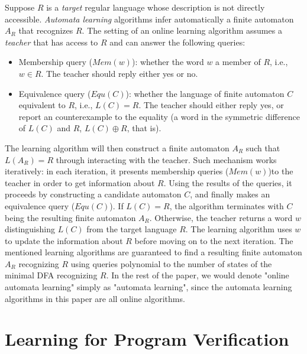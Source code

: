 Suppose $R$ is a \emph{target} regular language whose description is not directly accessible. \emph{Automata learning} algorithms \cite{Angluin87, BolligHKL09, RivestS93, KearnsV94} infer automatically a finite automaton $A_R$ that recognizes $R$. The setting of an online learning algorithm assumes a \emph{teacher} that has access to $R$ and can answer the following queries:
\begin{itemize}
	\item Membership query ($Mem(w)$): whether the word $w$ a member of $R$, i.e., $w \in R$. The teacher should reply either yes or no. 
	\item Equivalence query ($Equ(C)$): whether the language of finite automaton $C$ equivalent to $R$, i.e., $L(C) = R$. The teacher should either reply yes, or report an counterexample to the equality (a word in the symmetric difference of $L(C)$ and $R$, $L(C) \oplus R$, that is).	
\end{itemize}
The learning algorithm will then construct a finite automaton $A_R$ such that $L(A_R) = R$ through interacting with the teacher. Such mechanism works iteratively: in each iteration, it presents membership queries ($Mem(w)$)to the teacher in order to get information about $R$. Using the results of the queries, it proceeds by constructing a candidate automaton $C$, and finally makes an equivalence query ($Equ(C)$). If $L(C) = R$, the algorithm terminates with $C$ being the resulting finite automaton $A_R$. Otherwise, the teacher returns a word $w$ distinguishing $L(C)$ from the target language $R$. The learning algorithm uses $w$ to update the information about $R$ before moving on to the next iteration. The mentioned learning algorithms are guaranteed to find a resulting finite automaton $A_R$ recognizing $R$ using queries polynomial to the number of states of the minimal DFA recognizing $R$. In the rest of the paper, we would denote "online automata learning" simply as "automata learning", since the automata learning algorithms in this paper are all online algorithms. 

\section{Learning for Program Verification}\label{sec:learning_program_verify}

